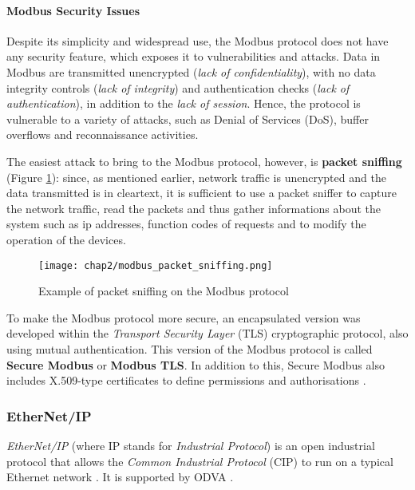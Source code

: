 \paragraph{Modbus Security Issues}
\label{par:2_modbus_sec}
Despite its simplicity and widespread use, the Modbus protocol does not have any security feature, which exposes it to vulnerabilities and attacks.\newline
Data in Modbus are transmitted unencrypted (\textit{lack of confidentiality}), with no data integrity controls (\textit{lack of integrity}) and authentication checks (\textit{lack of authentication}), in addition to the \textit{lack of session}. Hence, the protocol is vulnerable to a variety of attacks, such as Denial of Services (DoS), buffer overflows and reconnaissance activities.

\bigskip
The easiest attack to bring to the Modbus protocol, however, is \textbf{packet sniffing} (Figure \ref{fig:2_modbus_packet_sniffing}): since, as mentioned earlier, network traffic is unencrypted and the data transmitted is in cleartext, it is sufficient to use a packet sniffer to capture the network traffic, read the packets and thus gather informations about the system such as ip addresses, function codes of requests and to modify the operation of the devices.

\begin{figure}[ht]
	\centering
	\texttt{[image: chap2/modbus\_packet\_sniffing.png]}
	\caption{Example of packet sniffing on the Modbus protocol}
	\label{fig:2_modbus_packet_sniffing}
\end{figure}

To make the Modbus protocol more secure, an encapsulated version was developed within the \textit{Transport Security Layer} (TLS) cryptographic protocol, also using mutual authentication. This version of the Modbus protocol is called \textbf{Secure Modbus} or \textbf{Modbus TLS}. In addition to this, Secure Modbus also includes X.509-type certificates to define permissions and authorisations \cite{modbus_tls_pdf}.

\subsubsection{EtherNet/IP}
\label{subsubsec:enip}
\textit{EtherNet/IP} (where IP stands for \textit{Industrial Protocol}) is an open industrial protocol that allows the \textit{Common Industrial Protocol} (CIP) to run on a typical Ethernet network \cite{enip_pdf}. It is supported by ODVA \cite{odva_url}.

